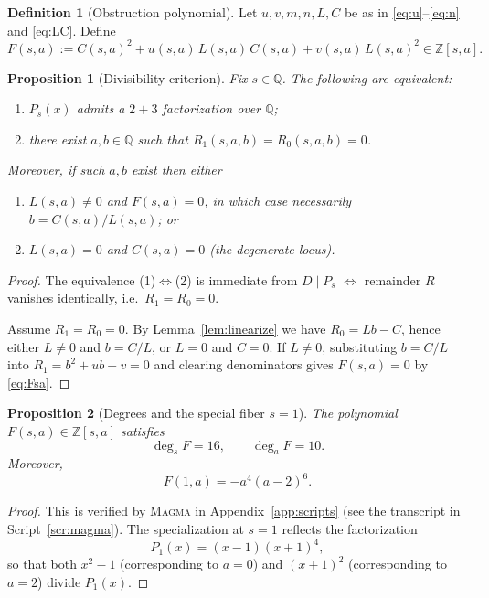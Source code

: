 \documentclass[12pt]{article}
\newtheorem{proposition}{Proposition}
\theoremstyle{remark}
\theoremstyle{definition}
\newtheorem{definition}{Definition}
\begin{document}
\begin{definition}[Obstruction polynomial]\label{def:Fsa}
Let $u,v,m,n,L,C$ be as in \eqref{eq:u}--\eqref{eq:n} and \eqref{eq:LC}.
Define
\begin{equation}\label{eq:Fsa}
F(s,a):=C(s,a)^{2}+u(s,a)\,L(s,a)\,C(s,a)+v(s,a)\,L(s,a)^{2}\in\mathbb{Z}[s,a].
\end{equation}
\end{definition}

\begin{proposition}[Divisibility criterion]\label{prop:criterion}
Fix $s\in\mathbb{Q}$.
The following are equivalent:
\begin{enumerate}
\item $P_s(x)$ admits a $2+3$ factorization over $\mathbb{Q}$;
\item there exist $a,b\in\mathbb{Q}$ such that $R_1(s,a,b)=R_0(s,a,b)=0$.
\end{enumerate}
Moreover, if such $a,b$ exist then either
\begin{enumerate}
\item[(A)] $L(s,a)\neq 0$ and $F(s,a)=0$, in which case necessarily $b=C(s,a)/L(s,a)$; or
\item[(B)] $L(s,a)=0$ and $C(s,a)=0$ (the \emph{degenerate locus}).
\end{enumerate}
\end{proposition}

\begin{proof}
The equivalence (1)$\Leftrightarrow$(2) is immediate from $D\mid P_s$ $\Leftrightarrow$ remainder $R$ vanishes identically, i.e.\ $R_1=R_0=0$.

Assume $R_1=R_0=0$. By Lemma~\ref{lem:linearize} we have $R_0=L b-C$, hence either $L\neq 0$ and $b=C/L$, or $L=0$ and $C=0$.
If $L\neq 0$, substituting $b=C/L$ into $R_1=b^{2}+u b+v=0$ and clearing denominators gives $F(s,a)=0$ by \eqref{eq:Fsa}.
\end{proof}

\begin{proposition}[Degrees and the special fiber $s=1$]\label{prop:degrees}
The polynomial $F(s,a)\in\mathbb{Z}[s,a]$ satisfies
\[
\deg_{s}F=16,\qquad \deg_{a}F=10.
\]
Moreover,
\[
F(1,a)=-a^{4}(a-2)^{6}.
\]
\end{proposition}

\begin{proof}
This is verified by \textsc{Magma} in Appendix~\ref{app:scripts} (see the transcript in Script~\ref{scr:magma}).
The specialization at $s=1$ reflects the factorization
\[
P_{1}(x)=(x-1)(x+1)^{4},
\]
so that both $x^{2}-1$ (corresponding to $a=0$) and $(x+1)^{2}$ (corresponding to $a=2$) divide $P_1(x)$.
\end{proof}
\end{document}
